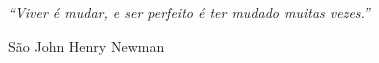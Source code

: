 \null\vfill
\begin{flushright}
\begin{minipage}{0.85\textwidth}
\raggedleft
\textit{``Viver é mudar, e ser perfeito é ter mudado muitas vezes.''}

\vspace{3mm}
São John Henry Newman
\end{minipage}
\end{flushright}
\vspace{1cm}
